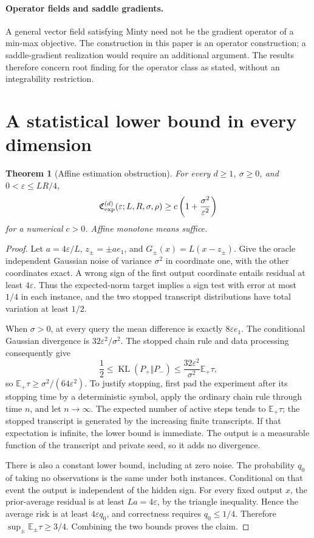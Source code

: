 \documentclass[11pt,a4paper]{article}
\newcommand{\E}{\mathbb E}
\newcommand{\eps}{\varepsilon}
\newcommand{\Cexp}{\mathfrak C_{\rm exp}}
\DeclareMathOperator{\KL}{KL}
\newtheorem{theorem}{Theorem}[section]
\theoremstyle{definition}
\theoremstyle{remark}
\begin{document}
\paragraph{Operator fields and saddle gradients.}
A general vector field satisfying Minty need not be the gradient operator
of a min-max objective. The construction in this paper is an operator
construction; a saddle-gradient realization would require an additional
argument. The results therefore concern root finding for the operator class
as stated, without an integrability restriction.

\appendix
\section{A statistical lower bound in every dimension}\label{app:statistical}
\begin{theorem}[Affine estimation obstruction]\label{thm:stat}
For every $d\ge1$, $\sigma\ge0$, and $0<\eps\le LR/4$,
\[
 \Cexp^{(d)}(\eps;L,R,\sigma,\rho)
 \ge c\left(1+\frac{\sigma^2}{\eps^2}\right)
\]
for a numerical $c>0$. Affine monotone means suffice.
\end{theorem}
\begin{proof}
Let $a=4\eps/L$, $z_\pm=\pm a e_1$, and $G_\pm(x)=L(x-z_\pm)$. Give the oracle independent Gaussian noise of variance $\sigma^2$ in coordinate one, with the other coordinates exact. A wrong sign of the first output coordinate entails residual at least $4\eps$. Thus the expected-norm target implies a sign test with error at most $1/4$ in each instance, and the two stopped transcript distributions have total variation at least $1/2$.

When $\sigma>0$, at every query the mean difference is exactly $8\eps e_1$. The conditional Gaussian divergence is $32\eps^2/\sigma^2$. The stopped chain rule and data processing consequently give
\[
 \frac12\le\KL(P_+\Vert P_-)
 \le\frac{32\eps^2}{\sigma^2}\E_+\tau,
\]
so $\E_+\tau\ge\sigma^2/(64\eps^2)$. To justify stopping, first pad the experiment after its stopping time by a deterministic symbol, apply the ordinary chain rule through time $n$, and let $n\to\infty$. The expected number of active steps tends to $\E_+\tau$; the stopped transcript is generated by the increasing finite transcripts. If that expectation is infinite, the lower bound is immediate. The output is a measurable function of the transcript and private seed, so it adds no divergence.

There is also a constant lower bound, including at zero noise. The probability $q_0$ of taking no observations is the same under both instances. Conditional on that event the output is independent of the hidden sign. For every fixed output $x$, the prior-average residual is at least $La=4\eps$, by the triangle inequality. Hence the average risk is at least $4\eps q_0$, and correctness requires $q_0\le1/4$. Therefore $\sup_\pm\E_\pm\tau\ge3/4$. Combining the two bounds proves the claim.
\end{proof}
\end{document}
